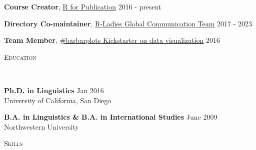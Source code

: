 \documentclass[9pt]{article}
\newenvironment{changemargin}[2]{%
  \begin{list}{}{%
    \setlength{\topsep}{0pt}%
    \setlength{\leftmargin}{#1}%
    \setlength{\rightmargin}{#2}%
    \setlength{\listparindent}{\parindent}%
    \setlength{\itemindent}{\parindent}%
    \setlength{\parsep}{\parskip}%
  }%
  \item[]}{\end{list}
}
\newcommand{\lineover}{
	\begin{changemargin}{-0.05in}{-0.05in}
		\vspace*{-8pt}
		\hrulefill \\
		\vspace*{-2pt}
	\end{changemargin}
}
\newcommand{\header}[1]{
	\begin{changemargin}{-0.5in}{-0.5in}
		\scshape{#1}\\
  	\lineover
	\end{changemargin}
}
\newenvironment{body} {
	\vspace*{-16pt}
	\begin{changemargin}{-0.25in}{-0.5in}
  }	
	{\end{changemargin}
}
\begin{document}
\begin{body}
	\vspace{14pt}
	
	\textbf{Course Creator}, \href{https://pagepiccinini.com/r-course/}{\color{red}R for Publication} \hfill 2016 - present\\
	\medskip

	\textbf{Directory Co-maintainer}, \href{https://rladies.org/about-us/team/}{\color{red}R-Ladies Global Communication Team} \hfill 2017 - 2023\\
	\medskip
	


	\textbf{Team Member}, \href{https://barbarplots.github.io/}{\color{red}\#barbarplots Kickstarter on data visualization} \hfill 2016\\
	\medskip
		
\end{body}

\smallskip


\header{\color{red}Education}

\begin{body}
	\vspace{14pt}
	
	\textbf{Ph.D. in Linguistics} \hfill Jan 2016\\
	University of California, San Diego\\
 	\medskip
	\medskip


	\textbf{B.A. in Linguistics \& B.A. in International Studies} \hfill June 2009\\
	Northwestern University\\
	\medskip
	\medskip

\end{body}

\smallskip


\header{\color{red}Skills}
\end{document}
